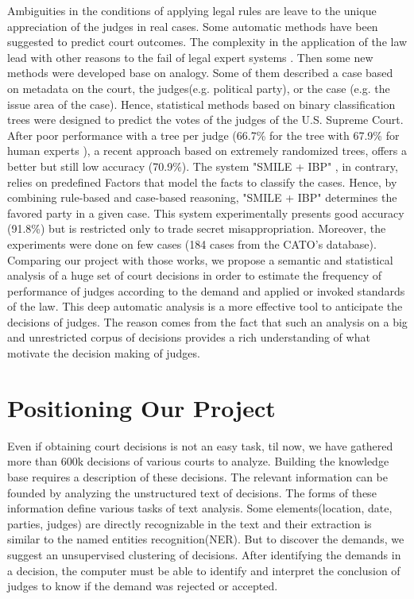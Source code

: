 \documentclass[runningheads,a4paper]{llncs}
\begin{document}
Ambiguities in the conditions of applying legal rules are leave to the unique appreciation of the judges in real cases. Some automatic methods have been suggested to predict court outcomes. The complexity in the application of the law lead with other reasons to the fail of legal expert systems \cite{leith2010risefall}. Then some new methods were developed base on analogy. Some of them described a case based on metadata on the court, the judges(e.g. political party), or the case (e.g. the issue area of the case). Hence,  statistical methods based on binary classification trees were designed to predict the votes of the judges of the U.S. Supreme Court. After poor performance with a tree per judge (66.7\% for the tree with 67.9\% for human experts \cite{martin2004competing}), a recent approach \cite{katz2014predicting} based on extremely randomized trees, offers a better but still low accuracy (70.9\%). The system "SMILE + IBP" \cite{Ashley2009}, in contrary, relies on predefined Factors that model the facts to classify the cases. Hence, by combining rule-based and case-based reasoning, "SMILE + IBP" determines the favored party in a given case. This system experimentally presents good accuracy (91.8\%) but is restricted only to trade secret misappropriation. Moreover, the experiments were done on few cases (184 cases from the CATO's database).
Comparing our project with those works, we propose a semantic and statistical analysis of a huge set of court decisions in order to estimate the frequency of performance of judges according to the demand and applied or invoked standards of the law. This deep automatic analysis is a more effective tool to anticipate the decisions of judges. The reason comes from the fact that such an analysis on a big and unrestricted corpus of decisions provides a rich understanding of what motivate the decision making of judges.

\section{Positioning Our Project}

Even if obtaining court decisions is not an easy task, til now, we have gathered more than 600k decisions of various courts to analyze. Building the knowledge base requires a description of these decisions. The relevant information can be founded by analyzing the unstructured text of decisions. The forms of these information define various tasks of text analysis. Some elements(location, date, parties, judges) are directly recognizable in the text and their extraction is similar to the named entities recognition(NER). But to discover the demands, we suggest an unsupervised clustering of decisions. After identifying the demands in a decision, the computer must be able to identify and interpret the  conclusion of judges to know if the demand was rejected or accepted.
\end{document}
